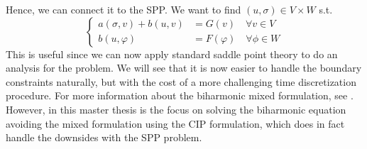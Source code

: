 Hence, we can connect it to the SPP. We want to find $( u,\sigma ) \in V \times W$ s.t.  \[
    \begin{cases}
       a( \sigma ,v) + b ( u, v )  & = G( v)   \quad  \forall v \in V \\
       b( u, \varphi  )  & = F( \varphi )     \quad \forall \phi \in W
    \end{cases}
\]
This is useful since we can now apply standard saddle point theory to do an analysis for the problem. We will see that it is now easier to handle the boundary constraints naturally, but with the cost of a more challenging time discretization
procedure.
For more information about the biharmonic mixed formulation, see \cite{babuvska1980analysis,cai2023nitsche}.
However, in this master thesis is the focus on solving the biharmonic equation avoiding the mixed formulation using the CIP formulation, which does in fact handle the downsides with the SPP problem.





